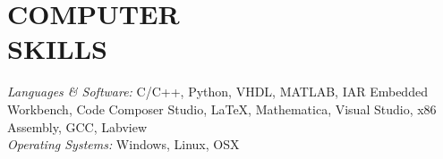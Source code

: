 
\section{COMPUTER \\ SKILLS} {\sl Languages \& Software:} C/C++, Python, VHDL,
	MATLAB, IAR Embedded Workbench, Code Composer Studio, \LaTeX,
	Mathematica, Visual Studio, x86 Assembly, GCC, Labview\\
	{\sl Operating Systems:} Windows, Linux, OSX
